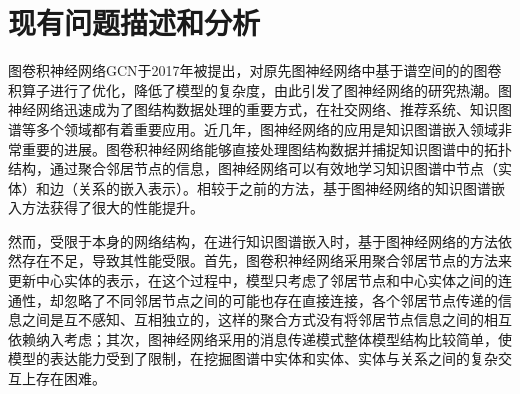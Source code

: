 





\section{现有问题描述和分析}

图卷积神经网络GCN于2017年被提出，对原先图神经网络中基于谱空间的的图卷积算子进行了优化，降低了模型的复杂度，由此引发了图神经网络的研究热潮。图神经网络迅速成为了图结构数据处理的重要方式，在社交网络、推荐系统、知识图谱等多个领域都有着重要应用。近几年，图神经网络的应用是知识图谱嵌入领域非常重要的进展。图卷积神经网络能够直接处理图结构数据并捕捉知识图谱中的拓扑结构，通过聚合邻居节点的信息，图神经网络可以有效地学习知识图谱中节点（实体）和边（关系的嵌入表示）。相较于之前的方法，基于图神经网络的知识图谱嵌入方法获得了很大的性能提升。

然而，受限于本身的网络结构，在进行知识图谱嵌入时，基于图神经网络的方法依然存在不足，导致其性能受限。首先，图卷积神经网络采用聚合邻居节点的方法来更新中心实体的表示，在这个过程中，模型只考虑了邻居节点和中心实体之间的连通性，却忽略了不同邻居节点之间的可能也存在直接连接，各个邻居节点传递的信息之间是互不感知、互相独立的，这样的聚合方式没有将邻居节点信息之间的相互依赖纳入考虑；其次，图神经网络采用的消息传递模式整体模型结构比较简单，使模型的表达能力受到了限制，在挖掘图谱中实体和实体、实体与关系之间的复杂交互上存在困难。

